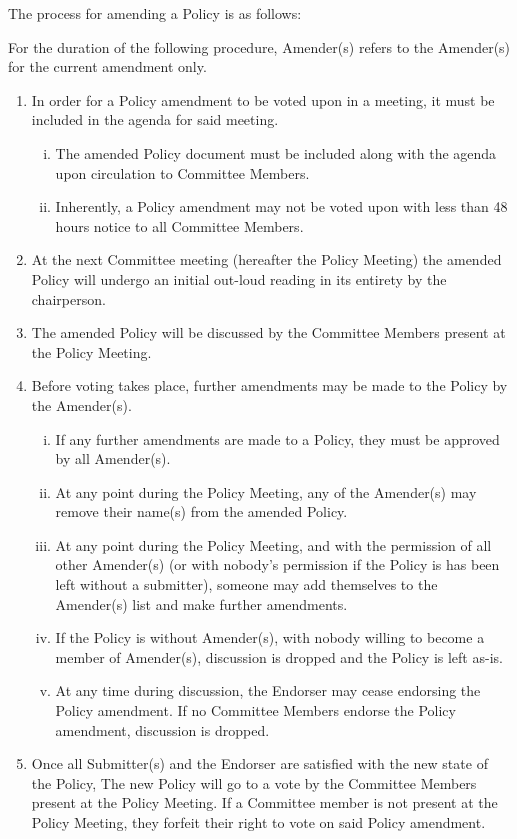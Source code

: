\documentclass[a4paper,12pt]{article}
\begin{document}
The process for amending a Policy is as follows:

For the duration of the following procedure, Amender(s) refers to the Amender(s) for the current amendment only.

\begin{enumerate}[1)]
	\item In order for a Policy amendment to be voted upon in a meeting, it must be included in the agenda for said meeting.
	\begin{enumerate}[i)]
		\item The amended Policy document must be included along with the agenda upon circulation to Committee Members.
		\item Inherently, a Policy amendment may not be voted upon with less than 48 hours notice to all Committee Members.
	\end{enumerate}
	\item At the next Committee meeting (hereafter the Policy Meeting) the amended Policy will undergo an initial out-loud reading in its entirety by the chairperson.
	\item The amended Policy will be discussed by the Committee Members present at the Policy Meeting.
	\item Before voting takes place, further amendments may be made to the Policy by the Amender(s).
	\begin{enumerate}[i)]
		\item If any further amendments are made to a Policy, they must be approved by all Amender(s).
		\item At any point during the Policy Meeting, any of the Amender(s) may remove their name(s) from the amended Policy.
		\item At any point during the Policy Meeting, and with the permission of all other Amender(s) (or with nobody's permission if the Policy is has been left without a submitter), someone may add themselves to the Amender(s) list and make further amendments.
		\item If the Policy is without Amender(s), with nobody willing to become a member of Amender(s), discussion is dropped and the Policy is left as-is.
		\item At any time during discussion, the Endorser may cease endorsing the Policy amendment. If no Committee Members endorse the Policy amendment, discussion is dropped.
	\end{enumerate}
	\item Once all Submitter(s) and the Endorser are satisfied with the new state of the Policy, The new Policy will go to a vote by the Committee Members present at the Policy Meeting. If a Committee member is not present at the Policy Meeting, they forfeit their right to vote on said Policy amendment.

\end{enumerate}
\end{document}
